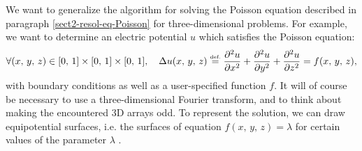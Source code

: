  
\begin{exo}
\label{exo-potential-electric-3d}
 
 We want to generalize the algorithm for solving the Poisson equation described in paragraph \ref{sect2-resol-eq-Poisson} for three-dimensional problems. For example, we want to determine an electric potential $ u $ which satisfies the Poisson equation:
\begin{equation*}
\forall (x, \, y, \, z) \in [0, \, 1] \times [0, \, 1] \times [0, \, 1], \quad \Delta u (x, \, y, \, z) \stackrel{\mbox{\upshape\tiny def.}}{=} \frac{ \partial^2 u}{\partial x^2} + \frac{ \partial^2 u}{\partial y^2} + \frac{ \partial^2 u}{\partial z^2} = f(x, \, y, \, z),
\end{equation*}
with boundary conditions as well as a user-specified function $ f $. It will of course be necessary to use a three-dimensional Fourier transform, and to think about making the encountered 3D arrays odd. To represent the solution, we can draw equipotential surfaces, i.e. the surfaces of equation $ f(x, \, y, \, z) = \lambda $ for certain values of the parameter $ \lambda $ .
\end{exo}
 
